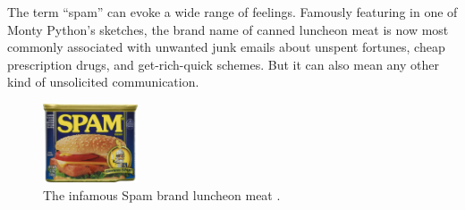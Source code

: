 
% 
\setcounter{page}{1}

The term ``spam'' can evoke a wide range of feelings. Famously featuring in one of Monty Python's sketches, the brand name of canned luncheon meat is now most commonly associated with unwanted junk emails about unspent fortunes, cheap prescription drugs, and get-rich-quick schemes. But it can also mean any other kind of unsolicited communication.
\vspace{-0.5cm}
\\
\begin{figure}
	\centering
	\captionsetup{width=0.3\textwidth}
	\includegraphics[width=0.25\textwidth]{pics/spam}
	\caption{The infamous Spam brand luncheon meat \cite{spamlogo}. }
	\label{fig:spam}
\end{figure}

